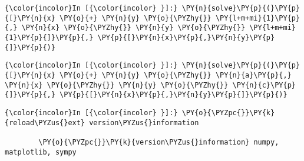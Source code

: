     \begin{Verbatim}[commandchars=\\\{\}]
{\color{incolor}In [{\color{incolor} }]:} \PY{n}{solve}\PY{p}{(}\PY{p}{[}\PY{n}{x} \PY{o}{+} \PY{n}{y} \PY{o}{\PYZhy{}} \PY{l+m+mi}{1}\PY{p}{,} \PY{n}{x} \PY{o}{\PYZhy{}} \PY{n}{y} \PY{o}{\PYZhy{}} \PY{l+m+mi}{1}\PY{p}{]}\PY{p}{,} \PY{p}{[}\PY{n}{x}\PY{p}{,}\PY{n}{y}\PY{p}{]}\PY{p}{)}
\end{Verbatim}



    \begin{Verbatim}[commandchars=\\\{\}]
{\color{incolor}In [{\color{incolor} }]:} \PY{n}{solve}\PY{p}{(}\PY{p}{[}\PY{n}{x} \PY{o}{+} \PY{n}{y} \PY{o}{\PYZhy{}} \PY{n}{a}\PY{p}{,} \PY{n}{x} \PY{o}{\PYZhy{}} \PY{n}{y} \PY{o}{\PYZhy{}} \PY{n}{c}\PY{p}{]}\PY{p}{,} \PY{p}{[}\PY{n}{x}\PY{p}{,}\PY{n}{y}\PY{p}{]}\PY{p}{)}
\end{Verbatim}







    \begin{Verbatim}[commandchars=\\\{\}]
{\color{incolor}In [{\color{incolor} }]:} \PY{o}{\PYZpc{}}\PY{k}{reload\PYZus{}ext} version\PYZus{}information
        
        \PY{o}{\PYZpc{}}\PY{k}{version\PYZus{}information} numpy, matplotlib, sympy
\end{Verbatim}

